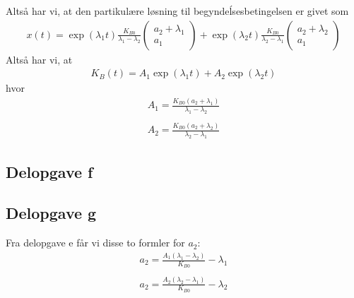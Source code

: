 \documentclass[12pt]{article}
\begin{document}
Altså har vi, at den partikulære løsning til begyndeĺsesbetingelsen er givet som
\begin{align}
x(t) = \exp(\lambda_1 t)\frac{K_{B0}}{\lambda_1 - \lambda_2}\begin{pmatrix}
a_2 + \lambda_1\\
a_1
\end{pmatrix}  + \exp(\lambda_2t)\frac{K_{B0}}{\lambda_2 - \lambda_1}\begin{pmatrix}
a_2 + \lambda_2\\
a_1
\end{pmatrix}
\end{align}
Altså har vi, at 
\begin{align}
K_B(t) = A_1\exp(\lambda_1 t) + A_2\exp(\lambda_2t)
\end{align}
hvor
\begin{align}
A_1 = \frac{K_{B0}(a_2 + \lambda_1)}{\lambda_1 - \lambda_2} \\ \\
A_2 = \frac{K_{B0}(a_2 + \lambda_2)}{\lambda_2 - \lambda_1}
\end{align}

\subsection{Delopgave f}

\subsection{Delopgave g}

Fra delopgave e får vi disse to formler for $a_2$:
\begin{align}
a_2 = \frac{A_1(\lambda_1 - \lambda_2)}{K_{B0}} - \lambda_1 \\ \\
a_2 = \frac{A_2(\lambda_2 - \lambda_1)}{K_{B0}} - \lambda_2
\end{align}
\end{document}

